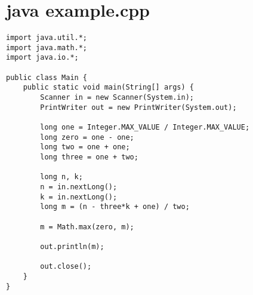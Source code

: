 \documentclass[a4paper,12pt]{report}
\begin{document}
\section{java example.cpp}
\begin{lstlisting}
import java.util.*;
import java.math.*;
import java.io.*;

public class Main {
    public static void main(String[] args) {
        Scanner in = new Scanner(System.in);
        PrintWriter out = new PrintWriter(System.out);
        
        long one = Integer.MAX_VALUE / Integer.MAX_VALUE;
        long zero = one - one;
        long two = one + one;
        long three = one + two;
        
        long n, k;
        n = in.nextLong();
        k = in.nextLong();
        long m = (n - three*k + one) / two;
        
        m = Math.max(zero, m);
        
        out.println(m);
        
        out.close();
    }
}
\end{lstlisting}
\end{document}
